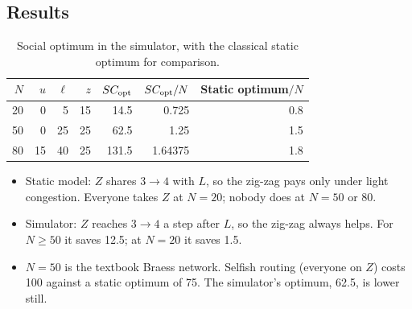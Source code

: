 \documentclass[11pt]{article}
\begin{document}
\subsection{Results}

\begin{table}[H]
\centering
\begin{tabular}{@{}rrrrrrr@{}}
\toprule
$N$ & $u$ & $\ell$ & $z$ & $SC_{\mathrm{opt}}$ & $SC_{\mathrm{opt}}/N$ & Static optimum$/N$ \\
\midrule
20 & 0  & 5  & 15 & 14.5  & 0.725   & 0.8 \\
50 & 0  & 25 & 25 & 62.5  & 1.25    & 1.5 \\
80 & 15 & 40 & 25 & 131.5 & 1.64375 & 1.8 \\
\bottomrule
\end{tabular}
\caption{Social optimum in the simulator, with the classical static optimum for comparison.}
\end{table}

\begin{itemize}
  \item Static model: $Z$ shares $3 \to 4$ with $L$, so the zig-zag pays only under light congestion.
        Everyone takes $Z$ at $N = 20$; nobody does at $N = 50$ or 80.
  \item Simulator: $Z$ reaches $3 \to 4$ a step after $L$, so the zig-zag always helps. For $N \ge 50$ it
        saves 12.5; at $N = 20$ it saves 1.5.
  \item $N = 50$ is the textbook Braess network. Selfish routing (everyone on $Z$) costs 100 against a
        static optimum of 75. The simulator's optimum, 62.5, is lower still.
\end{itemize}
\end{document}
